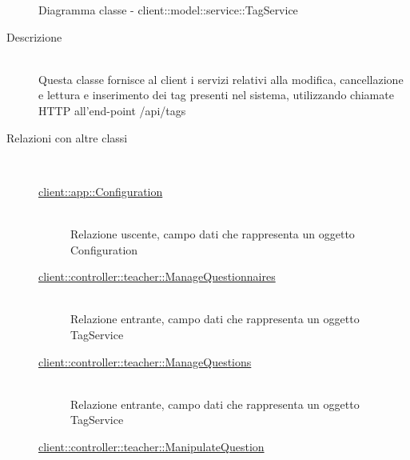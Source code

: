 \vspace{0.5cm}
\hypertarget{client::model::service::TagService}{}
\begin{figure}[H]
	\centering
	\caption{Diagramma classe - client::model::service::TagService}
\end{figure}\begin{description}
\item[Descrizione] \hfill \\
Questa classe fornisce al client i servizi relativi alla modifica, cancellazione e lettura e inserimento dei tag presenti nel sistema, utilizzando chiamate HTTP all'end-point /api/tags
\item[Relazioni con altre classi] \hfill \\
\vspace{-7mm}
\begin{description}
	\item[\hyperlink{client::app::Configuration}{client::app::Configuration}] \hfill \\
	Relazione uscente, campo dati che rappresenta un oggetto Configuration
	\item[\hyperlink{client::controller::teacher::ManageQuestionnaires}{client::controller::teacher::ManageQuestionnaires}] \hfill \\
	Relazione entrante, campo dati che rappresenta un oggetto TagService
	\item[\hyperlink{client::controller::teacher::ManageQuestions}{client::controller::teacher::ManageQuestions}] \hfill \\
	Relazione entrante, campo dati che rappresenta un oggetto TagService
	\item[\hyperlink{client::controller::teacher::ManipulateQuestion}{client::controller::teacher::ManipulateQuestion}] \hfill \\

\end{description}
\end{description}
